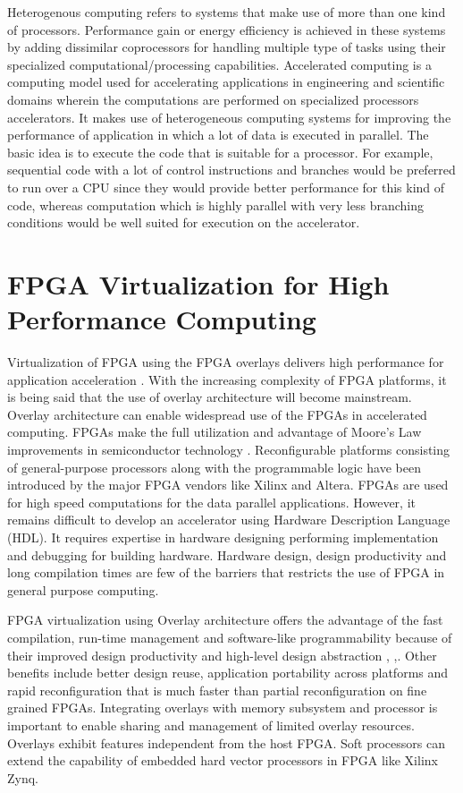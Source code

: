 Heterogenous computing refers to systems that make use of more than one kind of processors. Performance gain or energy efficiency is achieved in these systems by adding dissimilar coprocessors for handling multiple type of tasks using their specialized computational/processing capabilities. Accelerated computing is a computing model used for accelerating applications in engineering and scientific domains wherein the computations are performed on specialized processors accelerators. It makes use of heterogeneous computing systems for improving the performance of application in which a lot of data is executed in parallel. The basic idea is to execute the code that is suitable for a processor. For example, sequential code with a lot of control instructions and branches would be preferred to run over a CPU since they would provide better performance for this kind of code, whereas computation which is highly parallel with very less branching conditions would be well suited for execution on the accelerator.


\section{FPGA Virtualization for High Performance Computing}

Virtualization of FPGA using the FPGA overlays delivers high performance for application acceleration \cite{3}. With the increasing complexity of FPGA platforms, it is being said that the use of overlay architecture will become mainstream. Overlay architecture can enable widespread use of the FPGAs in accelerated computing. FPGAs make the full utilization and advantage of Moore's Law improvements in semiconductor technology \cite{4}. Reconfigurable platforms consisting of general-purpose processors along with the programmable logic have been introduced by the major FPGA vendors like Xilinx and Altera. FPGAs are used for high speed computations for the data parallel applications. However, it remains difficult to develop an accelerator using Hardware Description Language (HDL). It requires expertise in hardware designing performing implementation and debugging for building hardware. Hardware design, design productivity and long compilation times are few of the barriers that restricts the use of FPGA in general purpose computing.

FPGA virtualization using Overlay architecture offers the advantage of the fast compilation, run-time management and software-like programmability because of their improved design productivity and high-level design abstraction \cite{5}, \cite{6},\cite{7}. Other benefits include better design reuse, application portability across platforms and rapid reconfiguration that is much faster than partial reconfiguration on fine grained FPGAs. Integrating overlays with memory subsystem and processor is important to enable sharing and management of limited overlay resources. Overlays exhibit features independent from the host FPGA. Soft processors can extend the capability of embedded hard vector processors in FPGA like Xilinx Zynq.

